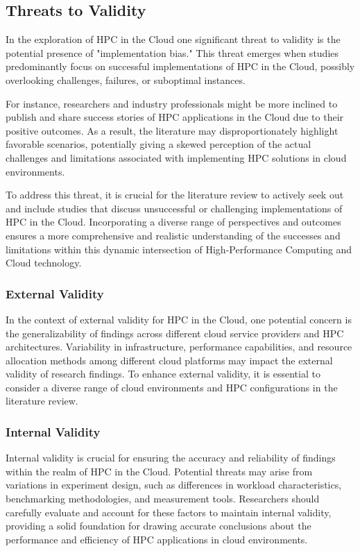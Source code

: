 \subsection{Threats to Validity}
\label{sec:threatsvalidity}

In the exploration of HPC in the Cloud one significant threat to validity is the potential presence of "implementation bias." This threat emerges when studies predominantly focus on successful implementations of HPC in the Cloud, possibly overlooking challenges, failures, or suboptimal instances.

For instance, researchers and industry professionals might be more inclined to publish and share success stories of HPC applications in the Cloud due to their positive outcomes. As a result, the literature may disproportionately highlight favorable scenarios, potentially giving a skewed perception of the actual challenges and limitations associated with implementing HPC solutions in cloud environments.

To address this threat, it is crucial for the literature review to actively seek out and include studies that discuss unsuccessful or challenging implementations of HPC in the Cloud. Incorporating a diverse range of perspectives and outcomes ensures a more comprehensive and realistic understanding of the successes and limitations within this dynamic intersection of High-Performance Computing and Cloud technology.

\subsubsection{External Validity}
In the context of external validity for HPC in the Cloud, one potential concern is the generalizability of findings across different cloud service providers and HPC architectures. Variability in infrastructure, performance capabilities, and resource allocation methods among different cloud platforms may impact the external validity of research findings. To enhance external validity, it is essential to consider a diverse range of cloud environments and HPC configurations in the literature review.

\subsubsection{Internal Validity}
Internal validity is crucial for ensuring the accuracy and reliability of findings within the realm of HPC in the Cloud. Potential threats may arise from variations in experiment design, such as differences in workload characteristics, benchmarking methodologies, and measurement tools. Researchers should carefully evaluate and account for these factors to maintain internal validity, providing a solid foundation for drawing accurate conclusions about the performance and efficiency of HPC applications in cloud environments.


